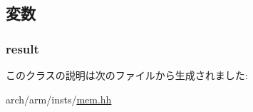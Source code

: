 \subsection{変数}
\hypertarget{classArmISA_1_1MemoryExImm_a43f8ecc8130e5285e0ae2134151d6d6a}{
\subsubsection[{result}]{ {\bf result}}}
\label{classArmISA_1_1MemoryExImm_a43f8ecc8130e5285e0ae2134151d6d6a}


このクラスの説明は次のファイルから生成されました:\begin{DoxyCompactItemize}
\item 
arch/arm/insts/\hyperlink{arm_2insts_2mem_8hh}{mem.hh}\end{DoxyCompactItemize}
